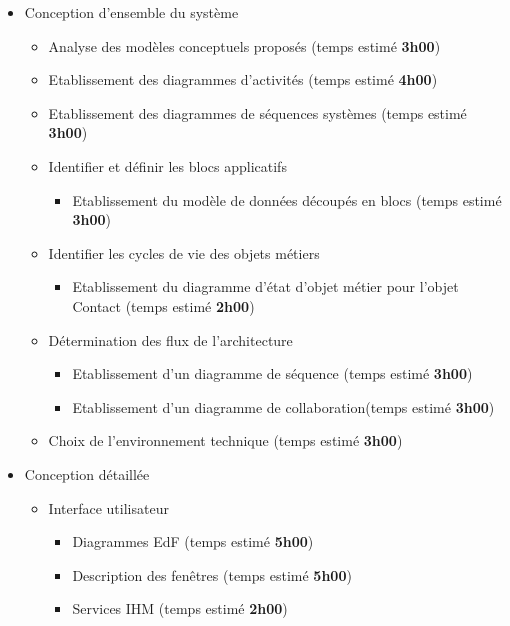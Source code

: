 \begin{itemize}
\item Conception d'ensemble du système

\begin{itemize}
\item Analyse des modèles conceptuels proposés (temps estimé \textbf{3h00})
\item Etablissement des diagrammes d'activités (temps estimé \textbf{4h00})
\item Etablissement des diagrammes de séquences systèmes (temps estimé \textbf{3h00})

\item Identifier et définir les blocs applicatifs

\begin{itemize}
\item Etablissement du modèle de données découpés en blocs (temps estimé \textbf{3h00})
\end{itemize}

\item Identifier les cycles de vie des objets métiers

\begin{itemize}
\item Etablissement du diagramme d'état d'objet métier pour l'objet Contact (temps estimé \textbf{2h00})
\end{itemize}

\item Détermination des flux de l'architecture

\begin{itemize}
\item Etablissement d'un diagramme de séquence (temps estimé \textbf{3h00})
\item Etablissement d'un diagramme de collaboration(temps estimé \textbf{3h00})
\end{itemize}

\item Choix de l'environnement technique (temps estimé \textbf{3h00})

\end{itemize}

\item Conception détaillée

\begin{itemize}
\item Interface utilisateur

\begin{itemize}
\item Diagrammes EdF (temps estimé \textbf{5h00})
\item Description des fenêtres (temps estimé \textbf{5h00})
\item Services IHM (temps estimé \textbf{2h00})
\end{itemize}


\end{itemize}
\end{itemize}
